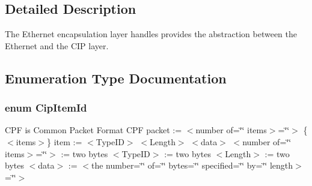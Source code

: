 \subsection{\-Detailed \-Description}
\-The \-Ethernet encapsulation layer handles provides the abstraction between the \-Ethernet and the \-C\-I\-P layer. 

\subsection{\-Enumeration \-Type \-Documentation}
\hypertarget{group__ENCAP_gafdcff621008b5e305165424c6ac4ea25}{
\subsubsection[{\-Cip\-Item\-Id}]{\setlength{\rightskip}{0pt plus 5cm}enum {\bf \-Cip\-Item\-Id}}}\label{d4/d91/group__ENCAP_gafdcff621008b5e305165424c6ac4ea25}


\-C\-P\-F is \-Common \-Packet \-Format \-C\-P\-F packet \-:= $<$number of=\char`\"{}\char`\"{} items$>$=\char`\"{}\char`\"{}$>$ \{$<$items$>$\} item \-:= $<$\-Type\-I\-D$>$ $<$\-Length$>$ $<$data$>$ $<$number of=\char`\"{}\char`\"{} items$>$=\char`\"{}\char`\"{}$>$ \-:= two bytes $<$\-Type\-I\-D$>$ \-:= two bytes $<$\-Length$>$ \-:= two bytes $<$data$>$ \-:= $<$the number=\char`\"{}\char`\"{} of=\char`\"{}\char`\"{} bytes=\char`\"{}\char`\"{} specified=\char`\"{}\char`\"{} by=\char`\"{}\char`\"{} length$>$=\char`\"{}\char`\"{}$>$ 

